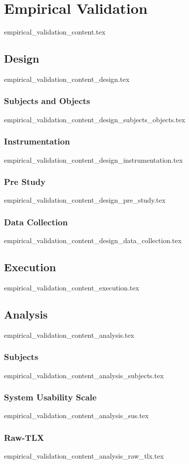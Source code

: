 \chapter{Empirical Validation}\label{sec:empirical_validation}
  {empirical_validation_content.tex}

\section{Design}\label{sub:design}
  {empirical_validation_content_design.tex}

\subsection{Subjects and Objects}\label{sub:subjects_objects}
  {empirical_validation_content_design_subjects_objects.tex}

\subsection{Instrumentation}\label{sub:instrumentation}
  {empirical_validation_content_design_instrumentation.tex}

\subsection{Pre Study}\label{sub:pre_study}
  {empirical_validation_content_design_pre_study.tex}

\subsection{Data Collection}
  {empirical_validation_content_design_data_collection.tex}

\section{Execution}\label{sub:execution}
  {empirical_validation_content_execution.tex}

\section{Analysis}\label{sub:analysis}
  {empirical_validation_content_analysis.tex}

\subsection{Subjects}
  {empirical_validation_content_analysis_subjects.tex}

\subsection{System Usability Scale}\label{sub:sus}
  {empirical_validation_content_analysis_sus.tex}

\subsection{Raw-TLX}\label{sub:raw-tlx}
  {empirical_validation_content_analysis_raw_tlx.tex}
